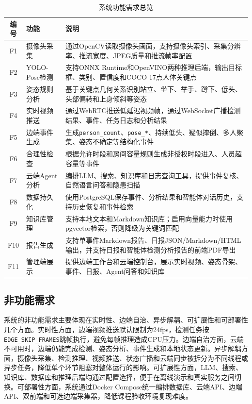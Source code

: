\begin{table}[H]
\caption{系统功能需求总览}
\begin{center}
\begin{tabular}{clp{8.8cm}}
\toprule
编号 & 功能 & 说明 \\
\midrule
F1  & 摄像头采集       & 通过OpenCV读取摄像头画面，支持摄像头索引、采集分辨率、推流宽度、JPEG质量和推流帧率配置 \\
F2  & YOLO-Pose检测    & 支持ONNX Runtime和OpenVINO两种推理后端，输出目标框、类别、置信度和COCO 17点人体关键点 \\
F3  & 姿态规则分析     & 基于关键点几何关系识别站立、坐下、举手、蹲下、低头、头部偏转和上身倾斜等姿态 \\
F4  & 实时视频推送     & 通过WebRTC推送低延迟视频帧，通过WebSocket广播检测结果、事件、任务日志和分析结果 \\
F5  & 边端事件生成     & 生成\texttt{person\_count}、\texttt{pose\_*}、持续低头、疑似摔倒、多人聚集、姿态不确定等结构化事件 \\
F6  & 合理性检查       & 根据允许时段和房间容量规则生成非授权时段进入、人员超容量等事件 \\
F7  & 云端Agent分析    & 编排LLM、搜索、知识库和日志查询工具，提供事件复核、自然语言问答和隐患扫描 \\
F8  & 数据持久化       & 使用PostgreSQL保存事件、分析结果和智能体对话历史，支持历史恢复和事件检索 \\
F9  & 知识库管理       & 支持本地文本和Markdown知识库；启用向量能力时使用pgvector检索，否则降级为关键词匹配 \\
F10 & 报告生成         & 支持单事件Markdown报告、日报JSON/Markdown/HTML输出，并支持日报和智能体检测分析报告的前端PDF导出 \\
F11 & 管理端展示       & 提供边端工作台和云端控制台，展示实时视频、姿态骨架、事件、日报、Agent问答和知识库 \\
\bottomrule
\end{tabular}
\end{center}
\label{tb:func}
\end{table}

\subsection{非功能需求}

系统的非功能需求主要体现在实时性、边端自治、异步解耦、可扩展性和可部署性几个方面。实时性方面，边端视频推送默认限制为24fps，检测任务按\verb|EDGE_SKIP_FRAMES|跳帧执行，避免每帧推理造成CPU压力。边端自治方面，云端不可用时，边端仍能完成检测、姿态分析、事件生成和本地状态更新。异步解耦方面，摄像头采集、检测推理、视频推送、状态广播和云端同步被拆分为不同线程或异步任务，降低单个环节阻塞对整体运行的影响。可扩展性方面，LLM、搜索、知识库、数据库和推理后端均通过配置选择，便于在离线演示和真实服务之间切换。可部署性方面，系统通过Docker Compose统一编排数据库、云端API、边端API、双前端和可选边端采集器，降低课程验收环境复现难度。

